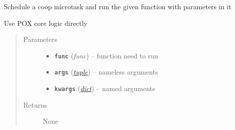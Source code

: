 \documentclass[letterpaper,10pt,english]{sphinxmanual}
\begin{document}

\begin{fulllineitems}
\label{util/misc:escape.util.misc.call_as_coop_task}
Schedule a coop microtask and run the given function with parameters in it

Use POX core logic directly
\begin{quote}\begin{description}
\item[{Parameters}] \leavevmode\begin{itemize}
\item {} 
\textbf{\texttt{func}} (\emph{func}) -- function need to run

\item {} 
\textbf{\texttt{args}} (\href{https://docs.python.org/2.7/library/functions.html\#tuple}{\emph{tuple}}) -- nameless arguments

\item {} 
\textbf{\texttt{kwargs}} (\href{https://docs.python.org/2.7/library/stdtypes.html\#dict}{\emph{dict}}) -- named arguments

\end{itemize}

\item[{Returns}] \leavevmode
None

\end{description}\end{quote}

\end{fulllineitems}

\end{document}
